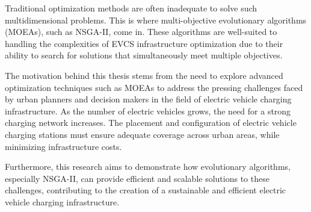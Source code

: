 \documentclass[12pt]{report}
\begin{document}
Traditional optimization methods are often inadequate to solve such multidimensional problems. This is where multi-objective evolutionary algorithms (MOEAs), such as NSGA-II, come in. These algorithms are well-suited to handling the complexities of EVCS infrastructure optimization due to their ability to search for solutions that simultaneously meet multiple objectives.

The motivation behind this thesis stems from the need to explore advanced optimization techniques such as MOEAs to address the pressing challenges faced by urban planners and decision makers in the field of electric vehicle charging infrastructure. As the number of electric vehicles grows, the need for a strong charging network increases. The placement and configuration of electric vehicle charging stations must ensure adequate coverage across urban areas, while minimizing infrastructure costs. 

Furthermore, this research aims to demonstrate how evolutionary algorithms, especially NSGA-II, can provide efficient and scalable solutions to these challenges, contributing to the creation of a sustainable and efficient electric vehicle charging infrastructure.
\end{document}
